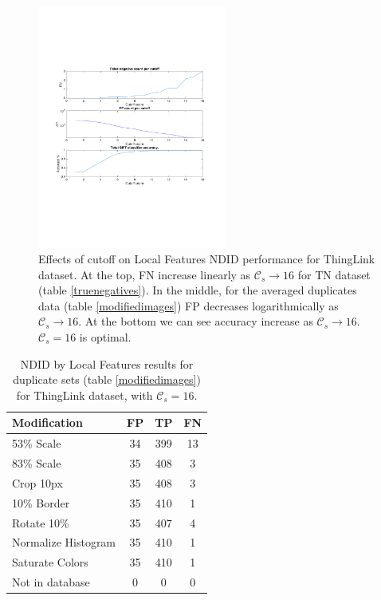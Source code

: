 \documentclass[english,12pt,a4paper,pdftex,elec,utf8]{aaltothesis}
\begin{document}
\begin{figure}[htb]
\begin{center}
\includegraphics[height=8cm]{figures/thinglink_SIFTCountROC}
\end{center}
\caption{ Effects of cutoff on Local Features NDID performance for ThingLink dataset. At the top, FN increase linearly as $\mathcal{C}_s \rightarrow 16$ for TN dataset (table \ref{truenegatives}). In the middle, for the averaged duplicates data (table \ref{modifiedimages}) FP decreases logarithmically as $\mathcal{C}_s \rightarrow 16$. At the bottom we can see accuracy increase as $\mathcal{C}_s \rightarrow 16$. $\mathcal{C}_s=16$ is optimal.}
\label{thinglinkfigcutoff}
\end{figure}


\begin{table}
\caption{ NDID by Local Features results for duplicate sets (table \ref{modifiedimages}) for ThingLink dataset, with $\mathcal{C}_s = 16$.}
\label{thinglinksiftresults}
\begin{center}
  \begin{tabular}{@{}lccc@{}}
    \toprule
    Modification & FP & TP & FN\\
    \hline
    53\% Scale & 34 & 399 & 13 \\
    83\% Scale & 35 & 408 & 3 \\
    Crop 10px  & 35 & 408 & 3 \\
    10\% Border & 35 & 410 & 1 \\
    Rotate 10\% & 35 & 407 & 4\\
    Normalize Histogram & 35 & 410 & 1\\
    Saturate Colors & 35 & 410 & 1\\
    Not in database & 0 & 0 & 0\\
    \bottomrule
\end{tabular}
\end{center}
\end{table}
\end{document}
